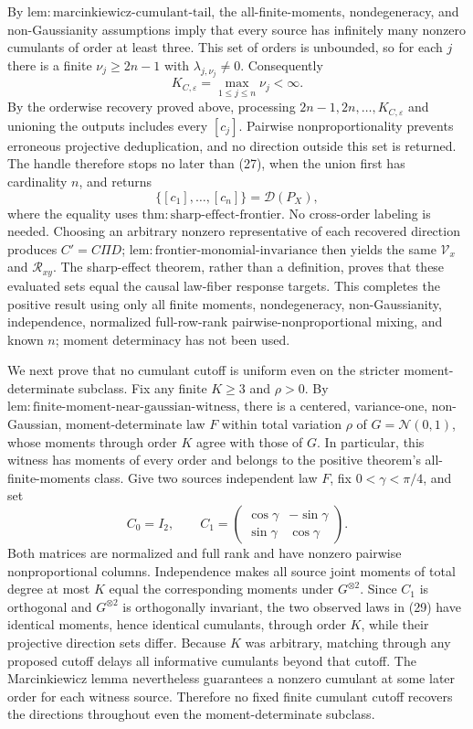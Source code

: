 By \(\mathrm{lem{:}marcinkiewicz\text{-}cumulant\text{-}tail}\), the all-finite-moments, nondegeneracy, and non-Gaussianity assumptions imply that every source has infinitely many nonzero cumulants of order at least three. This set of orders is unbounded, so for each \(j\) there is a finite \(\nu_j\ge2n-1\) with \(\lambda_{j,\nu_j}\ne0\). Consequently
\[
 K_{C,\varepsilon}=\max_{1\le j\le n}\nu_j<\infty. \tag{27}
\]
By the orderwise recovery proved above, processing \(2n-1,2n,\ldots,K_{C,\varepsilon}\) and unioning the outputs includes every \([c_j]\). Pairwise nonproportionality prevents erroneous projective deduplication, and no direction outside this set is returned. The handle therefore stops no later than (27), when the union first has cardinality \(n\), and returns
\[
 \{[c_1],\ldots,[c_n]\}=\mathcal D(P_X), \tag{28}
\]
where the equality uses \(\mathrm{thm{:}sharp\text{-}effect\text{-}frontier}\). No cross-order labeling is needed. Choosing an arbitrary nonzero representative of each recovered direction produces \(C'=C\Pi D\); \(\mathrm{lem{:}frontier\text{-}monomial\text{-}invariance}\) then yields the same \(\mathcal V_x\) and \(\mathcal R_{xy}\). The sharp-effect theorem, rather than a definition, proves that these evaluated sets equal the causal law-fiber response targets. This completes the positive result using only all finite moments, nondegeneracy, non-Gaussianity, independence, normalized full-row-rank pairwise-nonproportional mixing, and known \(n\); moment determinacy has not been used.

We next prove that no cumulant cutoff is uniform even on the stricter moment-determinate subclass. Fix any finite \(K\ge3\) and \(\rho>0\). By \(\mathrm{lem{:}finite\text{-}moment\text{-}near\text{-}gaussian\text{-}witness}\), there is a centered, variance-one, non-Gaussian, moment-determinate law \(F\) within total variation \(\rho\) of \(G=\mathcal N(0,1)\), whose moments through order \(K\) agree with those of \(G\). In particular, this witness has moments of every order and belongs to the positive theorem's all-finite-moments class. Give two sources independent law \(F\), fix \(0<\gamma<\pi/4\), and set
\[
 C_0=I_2,
 \qquad
 C_1=
 \begin{pmatrix}
 \cos\gamma&-\sin\gamma\\
 \sin\gamma&\cos\gamma
 \end{pmatrix}. \tag{29}
\]
Both matrices are normalized and full rank and have nonzero pairwise nonproportional columns. Independence makes all source joint moments of total degree at most \(K\) equal the corresponding moments under \(G^{\otimes2}\). Since \(C_1\) is orthogonal and \(G^{\otimes2}\) is orthogonally invariant, the two observed laws in (29) have identical moments, hence identical cumulants, through order \(K\), while their projective direction sets differ. Because \(K\) was arbitrary, matching through any proposed cutoff delays all informative cumulants beyond that cutoff. The Marcinkiewicz lemma nevertheless guarantees a nonzero cumulant at some later order for each witness source. Therefore no fixed finite cumulant cutoff recovers the directions throughout even the moment-determinate subclass.

